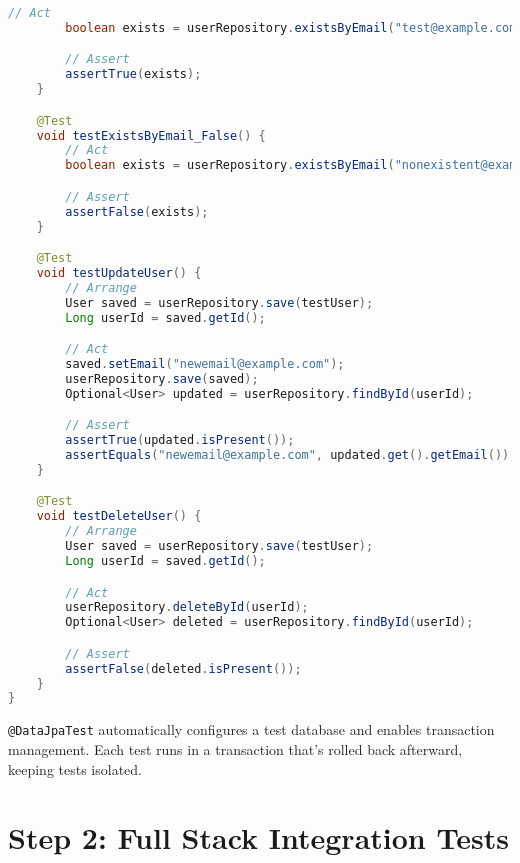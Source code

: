 \documentclass[12pt,a4paper]{article}
\begin{document}
\begin{lstlisting}[language=java, caption=UserRepositoryTest.java - Database Integration Tests]
        // Act
        boolean exists = userRepository.existsByEmail("test@example.com");

        // Assert
        assertTrue(exists);
    }

    @Test
    void testExistsByEmail_False() {
        // Act
        boolean exists = userRepository.existsByEmail("nonexistent@example.com");

        // Assert
        assertFalse(exists);
    }

    @Test
    void testUpdateUser() {
        // Arrange
        User saved = userRepository.save(testUser);
        Long userId = saved.getId();

        // Act
        saved.setEmail("newemail@example.com");
        userRepository.save(saved);
        Optional<User> updated = userRepository.findById(userId);

        // Assert
        assertTrue(updated.isPresent());
        assertEquals("newemail@example.com", updated.get().getEmail());
    }

    @Test
    void testDeleteUser() {
        // Arrange
        User saved = userRepository.save(testUser);
        Long userId = saved.getId();

        // Act
        userRepository.deleteById(userId);
        Optional<User> deleted = userRepository.findById(userId);

        // Assert
        assertFalse(deleted.isPresent());
    }
}
\end{lstlisting}

\begin{tipbox}
\texttt{@DataJpaTest} automatically configures a test database and enables transaction management. Each test runs in a transaction that's rolled back afterward, keeping tests isolated.
\end{tipbox}

\section{Step 2: Full Stack Integration Tests}
\end{document}
